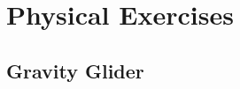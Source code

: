\documentclass[../main.tex]{subfiles}
\begin{document}
\chapter{Physical Exercises}
\section{Gravity Glider}

\end{document}
